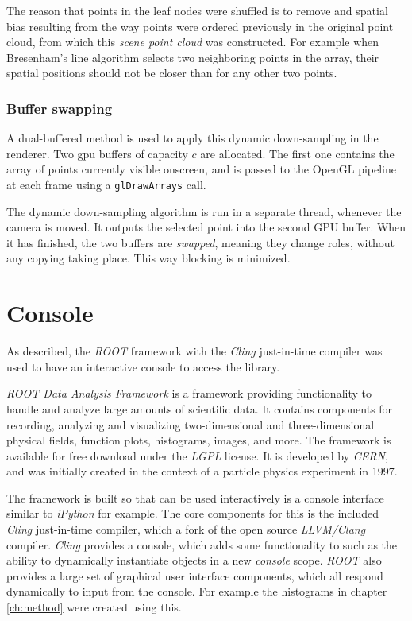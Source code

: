 The reason that points in the leaf nodes were shuffled is to remove and spatial bias resulting from the way points were ordered previously in the original point cloud, from which this \emph{scene point cloud} was constructed. For example when Bresenham's line algorithm selects two neighboring points in the array, their spatial positions should not be closer than for any other two points.

\subsubsection{Buffer swapping}
A dual-buffered method is used to apply this dynamic down-sampling in the renderer. Two \gls{gpu} buffers of capacity $c$ are allocated. The first one contains the array of points currently visible onscreen, and is passed to the OpenGL pipeline at each frame using a \verb&glDrawArrays& call.

The dynamic down-sampling algorithm is run in a separate thread, whenever the camera is moved. It outputs the selected point into the second \gls{GPU} buffer. When it has finished, the two buffers are \emph{swapped}, meaning they change roles, without any copying taking place. This way blocking is minimized.


\section{Console}
As described, the \emph{ROOT} framework with the \emph{Cling} just-in-time \cpp{} compiler was used to have an interactive console to access the library.

\emph{ROOT Data Analysis Framework} is a \cpp{} framework providing functionality to handle and analyze large amounts of scientific data. It contains components for recording, analyzing and visualizing two-dimensional and three-dimensional physical fields, function plots, histograms, images, and more. The framework is available for free download under the \emph{LGPL} license. It is developed by \emph{CERN}, and was initially created in the context of a particle physics experiment in 1997.

The framework is built so that \cpp{} can be used interactively is a console interface similar to \emph{iPython} for example. The core components for this is the included \emph{Cling} just-in-time compiler, which a fork of the open source \emph{LLVM/Clang} \cpp{} compiler. \emph{Cling} provides a console, which adds some functionality to \cpp{} such as the ability to dynamically instantiate objects in a new \emph{console} scope. \emph{ROOT} also provides a large set of graphical user interface components, which all respond dynamically to input from the console. For example the histograms in chapter \ref{ch:method} were created using this.


